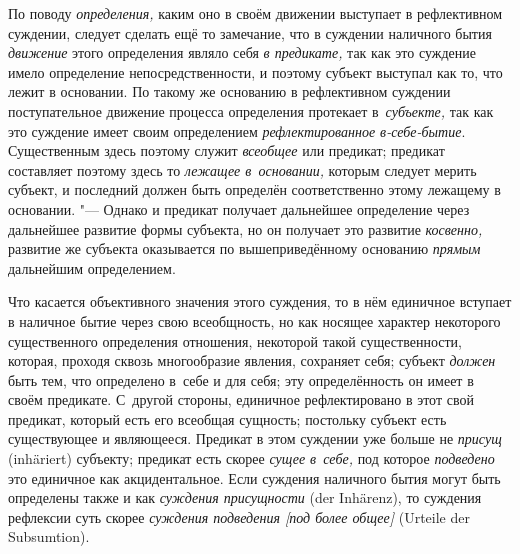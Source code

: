 По поводу {\em определения,} каким оно в своём движении выступает в
рефлективном суждении, следует сделать ещё то замечание, что в суждении
наличного бытия {\em движение} этого определения являло себя {\em в предикате,}
так как это суждение имело определение непосредственности, и поэтому субъект
выступал как то, что лежит в основании. По такому же основанию в рефлективном
суждении поступательное движение процесса определения протекает
в~{\em субъекте,} так как это суждение имеет своим определением
{\em рефлектированное в-себе-бытие}. Существенным здесь поэтому служит {\em
всеобщее} или предикат; предикат составляет поэтому здесь то {\em лежащее
в~основании,} которым следует мерить субъект, и последний должен быть определён
соответственно этому лежащему в основании. "--- Однако и предикат получает
дальнейшее определение через дальнейшее развитие формы субъекта, но он получает
это развитие {\em косвенно,} развитие же субъекта оказывается по
вышеприведённому основанию {\em прямым} дальнейшим определением.

Что касается объективного значения этого суждения, то в нём
единичное вступает в наличное бытие через свою всеобщность, но как носящее
характер некоторого существенного определения отношения, некоторой такой
существенности, которая, проходя сквозь многообразие явления, сохраняет
себя; субъект {\em должен} быть тем, что определено в~себе и для себя; эту
определённость он имеет в своём предикате. С~другой стороны, единичное
рефлектировано в этот свой предикат, который есть его всеобщая сущность;
постольку субъект есть существующее и являющееся. Предикат в этом суждении
уже больше не {\em присущ} (inhäriert) субъекту; предикат есть скорее
{\em сущее в~себе,} под которое {\em подведено} это единичное как
акцидентальное. Если суждения наличного бытия могут быть определены также
и как {\em суждения присущности} (der Inhärenz), то суждения рефлексии суть
скорее {\em суждения подведения [под более общее]} (Urteile der Subsumtion).

